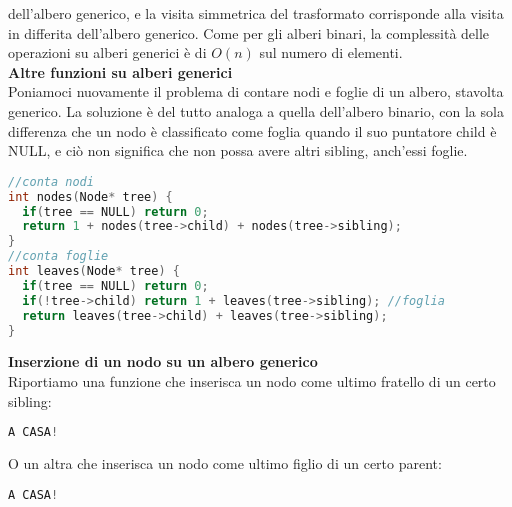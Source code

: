 \documentclass[a4paper,12pt]{article}
\begin{document}
dell'albero generico, e la visita simmetrica del trasformato corrisponde alla visita in differita dell'albero generico. Come per gli
alberi binari, la complessità delle operazioni su alberi generici è di $O(n)$ sul numero di elementi. \\
\textbf{Altre funzioni su alberi generici} \\
Poniamoci nuovamente il problema di contare nodi e foglie di un albero, stavolta generico. La soluzione 
è del tutto analoga a quella dell'albero binario, con la sola differenza che un nodo è classificato come foglia
quando il suo puntatore child è NULL, e ciò non significa che non possa avere altri sibling, anch'essi foglie.
\begin{lstlisting}[language=C++]
//conta nodi
int nodes(Node* tree) {
  if(tree == NULL) return 0;
  return 1 + nodes(tree->child) + nodes(tree->sibling);
}
//conta foglie
int leaves(Node* tree) {
  if(tree == NULL) return 0;
  if(!tree->child) return 1 + leaves(tree->sibling); //foglia
  return leaves(tree->child) + leaves(tree->sibling);
}
\end{lstlisting}
\textbf{Inserzione di un nodo su un albero generico} \\
Riportiamo una funzione che inserisca un nodo come ultimo fratello di un certo sibling:
\begin{lstlisting}[language=C++]
A CASA!
\end{lstlisting}
O un altra che inserisca un nodo come ultimo figlio di un certo parent:
\begin{lstlisting}[language=C++]
A CASA!
\end{lstlisting}
\end{document}
